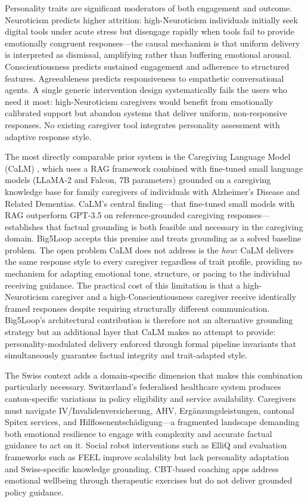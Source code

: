 \documentclass[10pt,a4paper]{report}
\begin{document}
Personality traits are significant moderators of both engagement and outcome. Neuroticism predicts higher attrition: high-Neuroticism individuals initially seek digital tools under acute stress but disengage rapidly when tools fail to provide emotionally congruent responses---the causal mechanism is that uniform delivery is interpreted as dismissal, amplifying rather than buffering emotional arousal. Conscientiousness predicts sustained engagement and adherence to structured features. Agreeableness predicts responsiveness to empathetic conversational agents. A single generic intervention design systematically fails the users who need it most: high-Neuroticism caregivers would benefit from emotionally calibrated support but abandon systems that deliver uniform, non-responsive responses. No existing caregiver tool integrates personality assessment with adaptive response style.

The most directly comparable prior system is the Caregiving Language Model (CaLM) \citep{Parmanto2024}, which uses a RAG framework combined with fine-tuned small language models (LLaMA-2 and Falcon, 7B parameters) grounded on a caregiving knowledge base for family caregivers of individuals with Alzheimer's Disease and Related Dementias. CaLM's central finding---that fine-tuned small models with RAG outperform GPT-3.5 on reference-grounded caregiving responses---establishes that factual grounding is both feasible and necessary in the caregiving domain. Big5Loop accepts this premise and treats grounding as a solved baseline problem. The open problem CaLM does not address is the \emph{how}: CaLM delivers the same response style to every caregiver regardless of trait profile, providing no mechanism for adapting emotional tone, structure, or pacing to the individual receiving guidance. The practical cost of this limitation is that a high-Neuroticism caregiver and a high-Conscientiousness caregiver receive identically framed responses despite requiring structurally different communication. Big5Loop's architectural contribution is therefore not an alternative grounding strategy but an additional layer that CaLM makes no attempt to provide: personality-modulated delivery enforced through formal pipeline invariants that simultaneously guarantee factual integrity and trait-adapted style.

The Swiss context adds a domain-specific dimension that makes this combination particularly necessary. Switzerland's federalised healthcare system produces canton-specific variations in policy eligibility and service availability. Caregivers must navigate IV/Invalidenversicherung, AHV, Ergänzungsleistungen, cantonal Spitex services, and Hilflosenentschädigung---a fragmented landscape demanding both emotional resilience to engage with complexity and accurate factual guidance to act on it. Social robot interventions such as ElliQ \citep{Broadbent2024} and evaluation frameworks such as FEEL \citep{Zhang2024} improve scalability but lack personality adaptation and Swiss-specific knowledge grounding. CBT-based coaching apps address emotional wellbeing through therapeutic exercises but do not deliver grounded policy guidance.
\end{document}
